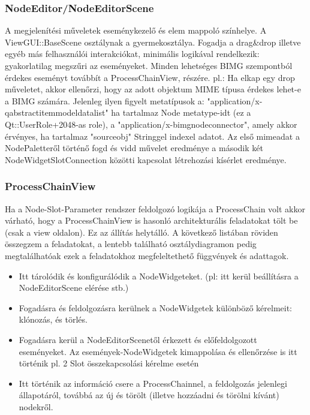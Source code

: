 \documentclass[a4paper,12pt,oneside]{report}
\begin{document}
\subsubsection{NodeEditor/NodeEditorScene}
A megjelenítési műveletek eseménykezelő és elem mappoló színhelye. A ViewGUI::BaseScene osztálynak a gyermekosztálya. Fogadja a drag\&drop illetve egyéb más felhasználói interakciókat, minimális logikával rendelkezik: gyakorlatilag megszűri az eseményeket. Minden lehetséges BIMG szempontból érdekes eseményt továbbít a ProcessChainView, részére. pl.: Ha elkap egy drop műveletet, akkor ellenőrzi, hogy az adott objektum MIME típusa érdekes lehet-e a BIMG számára.
Jelenleg ilyen figyelt metatípusok a: "application/x-qabstractitemmodeldatalist" ha tartalmaz Node metatype-idt (ez a Qt::UserRole+2048-as role), a "application/x-bimgnodeconnector", amely akkor érvényes, ha tartalmaz "sourceobj" Stringgel indexel adatot. Az első mimeadat a NodePaletteről történő fogd és vidd művelet eredménye a második két NodeWidgetSlotConnection közötti kapcsolat létrehozási kísérlet eredménye.

\subsubsection{ProcessChainView}
Ha a Node-Slot-Parameter rendszer feldolgozó logikája a ProcessChain volt akkor várható, hogy a ProcessChainView is hasonló architekturális feladatokat tölt be (csak a view oldalon).
Ez az állítás helytálló. A következő listában röviden összegzem a feladatokat, a lentebb található osztálydiagramon pedig megtalálhatóak ezek a feladatokhoz megfeleltethető függvények és adattagok.
\begin{itemize}
	\itemsep0em
	\item Itt tárolódik és konfigurálódik a NodeWidgeteket. (pl: itt kerül beállításra a NodeEditorScene elérése stb.)
	\item Fogadásra és feldolgozásra kerülnek a NodeWidgetek különböző kérelmeit: klónozás, és törlés.
	\item Fogadásra kerül a NodeEditorScenetől érkezett és előfeldolgozott eseményeket. Az események-NodeWidgetek kimappolása és ellenőrzése is itt történik pl. 2 Slot összekapcsolási kérelme esetén
	\item Itt történik az információ csere a ProcessChainnel, a feldolgozás jelenlegi állapotáról, továbbá az új és törölt (illetve hozzáadni és törölni kívánt) nodekről.
\end{itemize}
\end{document}
